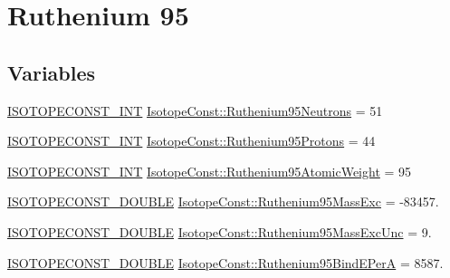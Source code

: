 \hypertarget{group___isotope_const-_ruthenium-_ru95}{}\section{Ruthenium 95}
\label{group___isotope_const-_ruthenium-_ru95}
\subsection*{Variables}
\begin{DoxyCompactItemize}
\item 
\mbox{\hyperlink{group___isotope_const-_macros_ga5f18360b3e99483a35c32d789e62621c}{I\+S\+O\+T\+O\+P\+E\+C\+O\+N\+S\+T\+\_\+\+I\+NT}} \mbox{\hyperlink{group___isotope_const-_ruthenium-_ru95_gaf184b7d1f121ce279acada6c4646b54e}{Isotope\+Const\+::\+Ruthenium95\+Neutrons}} = 51
\item 
\mbox{\hyperlink{group___isotope_const-_macros_ga5f18360b3e99483a35c32d789e62621c}{I\+S\+O\+T\+O\+P\+E\+C\+O\+N\+S\+T\+\_\+\+I\+NT}} \mbox{\hyperlink{group___isotope_const-_ruthenium-_ru95_ga05204c959c06a9ed522a542b5711993e}{Isotope\+Const\+::\+Ruthenium95\+Protons}} = 44
\item 
\mbox{\hyperlink{group___isotope_const-_macros_ga5f18360b3e99483a35c32d789e62621c}{I\+S\+O\+T\+O\+P\+E\+C\+O\+N\+S\+T\+\_\+\+I\+NT}} \mbox{\hyperlink{group___isotope_const-_ruthenium-_ru95_ga7cd0219c62d31c6b2f9ae3acb9519388}{Isotope\+Const\+::\+Ruthenium95\+Atomic\+Weight}} = 95
\item 
\mbox{\hyperlink{group___isotope_const-_macros_ga8f45a7272ce02c0b4c65c44636ed719a}{I\+S\+O\+T\+O\+P\+E\+C\+O\+N\+S\+T\+\_\+\+D\+O\+U\+B\+LE}} \mbox{\hyperlink{group___isotope_const-_ruthenium-_ru95_gafc8eb5bad153fc9be02dcd8e205e2d5f}{Isotope\+Const\+::\+Ruthenium95\+Mass\+Exc}} = -\/83457.
\item 
\mbox{\hyperlink{group___isotope_const-_macros_ga8f45a7272ce02c0b4c65c44636ed719a}{I\+S\+O\+T\+O\+P\+E\+C\+O\+N\+S\+T\+\_\+\+D\+O\+U\+B\+LE}} \mbox{\hyperlink{group___isotope_const-_ruthenium-_ru95_gae7c35138c4ac674c57aee0d4abfad708}{Isotope\+Const\+::\+Ruthenium95\+Mass\+Exc\+Unc}} = 9.
\item 
\mbox{\hyperlink{group___isotope_const-_macros_ga8f45a7272ce02c0b4c65c44636ed719a}{I\+S\+O\+T\+O\+P\+E\+C\+O\+N\+S\+T\+\_\+\+D\+O\+U\+B\+LE}} \mbox{\hyperlink{group___isotope_const-_ruthenium-_ru95_gacfda04a39f39816e1f53b64ba13f0999}{Isotope\+Const\+::\+Ruthenium95\+Bind\+E\+PerA}} = 8587.
\item 

\end{DoxyCompactItemize}
